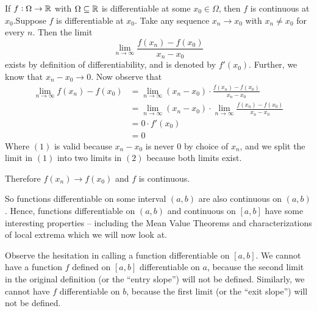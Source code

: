 \begin{SWP}{\thm}{If $f: \Omega \rightarrow \mathbb{R}$ with $\Omega \subseteq \mathbb{R}$ is differentiable at some $x_0 \in \Omega$, then $f$ is continuous at $x_0$.}Suppose $f$ is differentiable at $x_0$. Take any sequence $x_n \rightarrow x_0$ with $x_n \neq x_0$ for every $n$. Then the limit
$$
\lim_{n\rightarrow \infty}\frac{f(x_n) - f(x_0)}{x_n - x_0}
$$
exists by definition of differentiability, and is denoted by $f'(x_0)$. Further, we know that $x_n - x_0 \rightarrow 0$. Now observe that
\begin{align}
\lim_{n \rightarrow \infty} f(x_n) - f(x_0) &= \lim_{n \rightarrow \infty} (x_n - x_0)\cdot\frac{f(x_n) - f(x_0)}{x_n - x_0}\\
                                            &= \lim_{n \rightarrow \infty} (x_n - x_0)\cdot\lim_{n \rightarrow \infty}\frac{f(x_n) - f(x_0)}{x_n - x_0}\\
                                            &= 0\cdot f'(x_0)\\
                                            &= 0
\end{align}
Where $(1)$ is valid because $x_n - x_0$ is never $0$ by choice of $x_n$, and we split the limit in $(1)$ into two limits in $(2)$ because both limits exist.

Therefore $f(x_n) \rightarrow f(x_0)$ and $f$ is continuous.
\end{SWP}

So functions differentiable on some interval $(a, b)$ are also continuous on $(a, b)$. Hence, functions differentiable on $(a, b)$ and continuous on $[a, b]$ have some interesting properties -- including the Mean Value Theorems and characterizations of local extrema which we will now look at.

Observe the hesitation in calling a function differentiable on $[a, b]$. We cannot have a function $f$ defined on $[a, b]$ differentiable on $a$, because the second limit in the original definition (or the ``entry slope'') will not be defined. Similarly, we cannot have $f$ differentiable on $b$, because the first limit (or the ``exit slope'') will not be defined.
